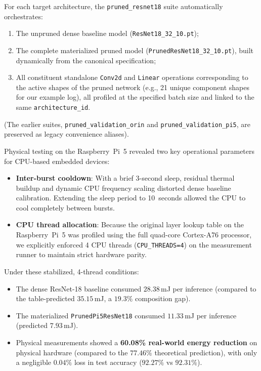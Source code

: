 For each target architecture, the \texttt{pruned\_resnet18} suite automatically orchestrates:
\begin{enumerate}
    \item The unpruned dense baseline model (\texttt{ResNet18\_32\_10.pt});
    \item The complete materialized pruned model (\texttt{PrunedResNet18\_32\_10.pt}), built dynamically from the canonical specification;
    \item All constituent standalone \texttt{Conv2d} and \texttt{Linear} operations corresponding to the active shapes of the pruned network (e.g., 21 unique component shapes for our example log), all profiled at the specified batch size and linked to the same \texttt{architecture\_id}.
\end{enumerate}
(The earlier suites, \texttt{pruned\_}\allowbreak\texttt{validation\_}\allowbreak\texttt{orin} and \texttt{pruned\_}\allowbreak\texttt{validation\_}\allowbreak\texttt{pi5}, are preserved as legacy convenience aliases).

Physical testing on the Raspberry~Pi~5 revealed two key operational parameters for CPU-based embedded devices:
\begin{itemize}
    \item \textbf{Inter-burst cooldown}: With a brief 3-second sleep, residual thermal buildup and dynamic CPU frequency scaling distorted dense baseline calibration. Extending the sleep period to 10~seconds allowed the CPU to cool completely between bursts.
    \item \textbf{CPU thread allocation}: Because the original layer lookup table on the Raspberry~Pi~5 was profiled using the full quad-core Cortex-A76 processor, we explicitly enforced 4 CPU threads (\texttt{CPU\_THREADS=4}) on the measurement runner to maintain strict hardware parity.
\end{itemize}
Under these stabilized, 4-thread conditions:
\begin{itemize}
    \item The dense ResNet-18 baseline consumed $28.38$\,mJ per inference (compared to the table-predicted $35.15$\,mJ, a $19.3\%$ composition gap).
    \item The materialized \texttt{PrunedPi5ResNet18} consumed $11.33$\,mJ per inference (predicted $7.93$\,mJ).
    \item Physical measurements showed a \textbf{60.08\% real-world energy reduction} on physical hardware (compared to the $77.46\%$ theoretical prediction), with only a negligible $0.04\%$ loss in test accuracy ($92.27\%$ vs $92.31\%$).
\end{itemize}

